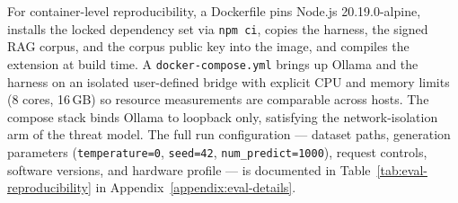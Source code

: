 For container-level reproducibility, a Dockerfile pins Node.js 20.19.0-alpine, installs the locked dependency set via \texttt{npm ci}, copies the harness, the signed RAG corpus, and the corpus public key into the image, and compiles the extension at build time. A \texttt{docker-compose.yml} brings up Ollama and the harness on an isolated user-defined bridge with explicit CPU and memory limits (8 cores, 16\,GB) so resource measurements are comparable across hosts. The compose stack binds Ollama to loopback only, satisfying the network-isolation arm of the threat model. The full run configuration --- dataset paths, generation parameters (\texttt{temperature=0}, \texttt{seed=42}, \texttt{num\_predict=1000}), request controls, software versions, and hardware profile --- is documented in Table~\ref{tab:eval-reproducibility} in Appendix~\ref{appendix:eval-details}.
